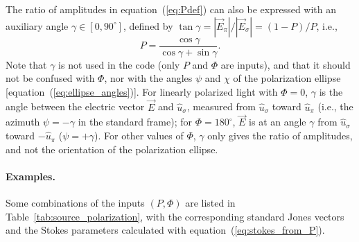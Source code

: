 \documentclass{iucr}
\begin{document}
The ratio of amplitudes in equation~(\ref{eq:Pdef}) can also be expressed with an auxiliary angle $\gamma\in[0,90^\circ]$, defined by $\tan\gamma=|\vec{E}_\pi|/|\vec{E}_\sigma|=(1-P)/P$, i.e.,
\begin{equation}
   P = \frac{\cos \gamma}{\cos \gamma + \sin \gamma}.
\end{equation}
Note that $\gamma$ is not used in the code (only $P$ and $\Phi$ are inputs), and that it should not be confused with $\Phi$, nor with the angles $\psi$ and $\chi$ of the polarization ellipse [equation~(\ref{eq:ellipse_angles})]. For linearly polarized light with $\Phi=0$, $\gamma$ is the angle between the electric vector $\vec{E}$ and $\hat{u}_\sigma$, measured from $\hat{u}_\sigma$ toward $\hat{u}_\pi$ (i.e., the azimuth $\psi=-\gamma$ in the standard frame); for $\Phi=180^\circ$, $\vec{E}$ is at an angle $\gamma$ from $\hat{u}_\sigma$ toward $-\hat{u}_\pi$ ($\psi=+\gamma$). For other values of $\Phi$, $\gamma$ only gives the ratio of amplitudes, and not the orientation of the polarization ellipse.

\paragraph{Examples.}
Some combinations of the inputs $(P, \Phi)$ are listed in Table~\ref{tab:source_polarization}, with the corresponding standard Jones vectors and the Stokes parameters calculated with equation~(\ref{eq:stokes_from_P}).
\end{document}
